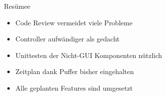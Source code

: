 \documentclass[22pt]{beamer}
\begin{document}
\begin{frame}{Resümee}
\begin{itemize}[<+->]
 \item Code Review vermeidet viele Probleme
 \item Controller aufwändiger als gedacht
 \item Unittesten der Nicht-GUI Komponenten nützlich
 \item Zeitplan dank Puffer bisher eingehalten
 \item Alle geplanten Features sind umgesetzt
\end{itemize}
\end{frame}
\end{document}

